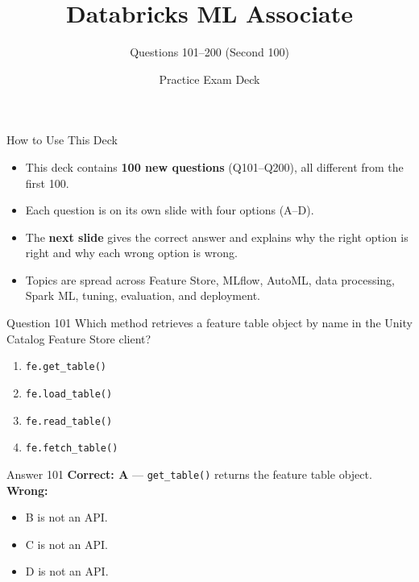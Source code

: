 \documentclass[aspectratio=169,11pt]{beamer}
\title{Databricks ML Associate}
\subtitle{Questions 101--200 (Second 100)}
\author{Practice Exam Deck}
\date{}
\begin{document}
	
	\begin{frame}
		\titlepage
	\end{frame}
	
	\begin{frame}{How to Use This Deck}
		\begin{itemize}
			\item This deck contains \textbf{100 new questions} (Q101--Q200), all different from the first 100.
			\item Each question is on its own slide with four options (A--D).
			\item The \textbf{next slide} gives the correct answer and explains why the right option is right and why each wrong option is wrong.
			\item Topics are spread across Feature Store, MLflow, AutoML, data processing, Spark ML, tuning, evaluation, and deployment.
		\end{itemize}
	\end{frame}
	
	\begin{frame}{Question 101}
		Which method retrieves a feature table object by name in the Unity Catalog Feature Store client?
		\begin{enumerate}[label=\Alph*.]
			\item \texttt{fe.get\_table()}
			\item \texttt{fe.load\_table()}
			\item \texttt{fe.read\_table()}
			\item \texttt{fe.fetch\_table()}
		\end{enumerate}
	\end{frame}
	\begin{frame}{Answer 101}
		\textbf{Correct: A} --- \texttt{get\_table()} returns the feature table object.\\
		\vspace{0.5em}
		\textbf{Wrong:}
		\begin{itemize}
			\item B is not an API.
			\item C is not an API.
			\item D is not an API.
		\end{itemize}
	\end{frame}
	
\end{document}
